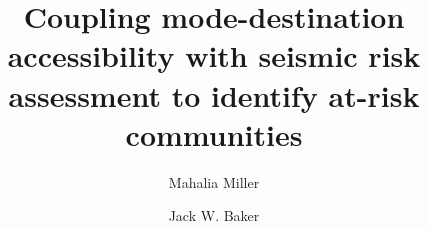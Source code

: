 \documentclass[3p,times]{elsarticle}
\begin{document}
\begin{frontmatter}


\dochead{}

\title{Coupling mode-destination accessibility with seismic risk assessment to identify at-risk communities}


\author[label1]{Mahalia Miller}
\author[label1]{Jack W. Baker}

\address[label1]{Stanford University, Stanford, CA USA}


\end{frontmatter}
\end{document}
